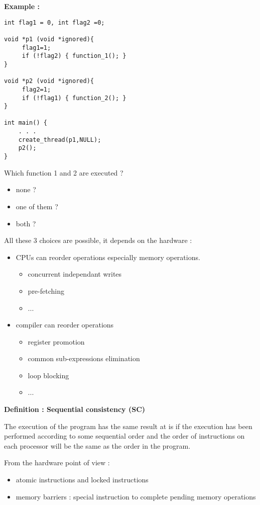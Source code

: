 \textbf{Example :}

\begin{verbatim}
int flag1 = 0, int flag2 =0;

void *p1 (void *ignored){
     flag1=1;
     if (!flag2) { function_1(); }
}

void *p2 (void *ignored){
     flag2=1;
     if (!flag1) { function_2(); }
}

int main() {
	. . . 
	create_thread(p1,NULL);
	p2();
}

\end{verbatim}

Which function 1 and 2 are executed ?
\begin{itemize}
\item none ?
\item one of them ?
\item both ?
\end{itemize}

All these 3 choices are possible, it depends on the hardware :
\begin {itemize}
\item CPUs can reorder operations especially memory operations.
\begin{itemize}
\item concurrent independant writes
\item pre-fetching
\item ...
\end{itemize}
\item compiler can reorder operations 
\begin{itemize}
\item register promotion
\item common sub-expressions elimination
\item loop blocking
\item ...
\end{itemize}
\end{itemize}


\textbf{Definition : Sequential consistency (SC)}

The execution of the program has the same result at is if the execution has been performed according to some sequential order and the order of instructions on each processor will be the same as the order in the program.

From the hardware point of view :
\begin{itemize}
\item atomic instructions and locked instructions
\item memory barriers : special instruction to complete pending memory operations
\end{itemize}

